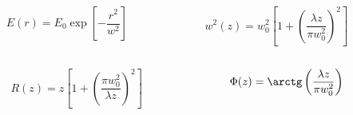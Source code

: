 \begin{frame}[c]
\begin{columns}[t]
\begin{column}{0.49\textwidth}
		\end{column}
	\end{columns}
	\begin{columns}[b]
		\begin{column}{0.49\textwidth}%
			$$
				E(r)=E_0\exp\left[-\frac{r^2}{w^2}\right]
			$$
		\end{column}
		\begin{column}{0.49\textwidth}%
			$$
				w^2(z)=w_0^2\left[1+\left(\frac{\lambda z}{\pi w_0^2}\right)^2\right]
			$$
		\end{column}
	\end{columns}			
	\begin{columns}[b]
		\begin{column}{0.49\textwidth}%
			$$
				R(z)=z\left[1+\left(\frac{\pi w_0^2}{\lambda z}\right)^2\right]
			$$
		\end{column}
		\begin{column}{0.49\textwidth}%
			$$
				\Phi(z)=\arctg\left(\frac{\lambda z}{\pi w_0^2}\right)
			$$
		\end{column}
	\end{columns}
\end{frame}

